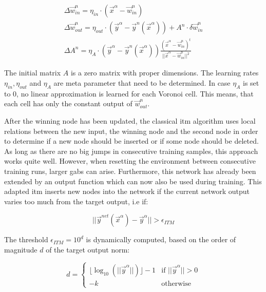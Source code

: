 \begin{equation}
\begin{split}
\Delta \vec{w}^n_{in} = \eta_{in} \cdot (\vec{x}^\alpha - \vec{w}^n_{in}) \\
\Delta \vec{w}^n_{out} = \eta_{out} \cdot (\vec{y}^\alpha - \vec{y}^n(\vec{x}^\alpha)) + A^n \cdot \delta \vec{w}^n_{in} \\
\Delta A^n = \eta_A \cdot (\vec{y}^\alpha - \vec{y}^n(\vec{x}^\alpha)) \frac{(\vec{x}^\alpha - \vec{w}^n_{in})^t}{||\vec{x}^\alpha - \vec{w}^n_{in}||^2}
\end{split}
\end{equation}

The initial matrix $A$ is a zero matrix with proper dimensions. The learning rates $\eta_{in}, \eta_{out}$ and $\eta_A$ are meta parameter that need to be determined. In case $\eta_A$ is set to 0, no linear approximation is learned for each Voronoi cell. This means, that each cell has only the constant output of $\vec{w}^n_{out}$.

After the winning node has been updated, the classical \gls{itm} algorithm uses local relations between the new input, the winning node and the second node in order to determine if a new node should be inserted or if some node should be deleted. As long as there are no big jumps in consecutive training samples, this approach works quite well. However, when resetting the environment between consecutive training runs, larger gabs can arise. Furthermore, this network has already been extended by an output function which can now also be used during training. This adapted \gls{itm} inserts new nodes into the network if the current network output varies too much from the target output, i.e if:

\begin{equation}
||\vec{y}^{net}(\vec{x}^\alpha)-\vec{y}^\alpha|| > \epsilon_{ITM}
\end{equation}

The threshold $\epsilon_{ITM} = 10^d$ is dynamically computed, based on the order of magnitude $d$ of the target output norm: %

\begin{equation}
d = \begin{cases}
\lfloor\log_{10}(||\vec{y}^\alpha||)\rfloor-1 & \text{if $||\vec{y}^\alpha|| > 0$} \\
-k & \text{otherwise}
\end{cases}
\end{equation}

